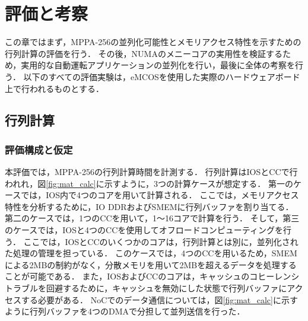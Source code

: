 \documentclass[submit,techrep]{ipsj_v2/UTF8/ipsj}
\begin{document}
\section{評価と考察}
\label{sec:evaluations}
この章ではまず，MPPA-256の並列化可能性とメモリアクセス特性を示すための行列計算の評価を行う．
その後，NUMAのメニーコアの実用性を検証するため，実用的な自動運転アプリケーションの並列化を行い，最後に全体の考察を行う．
以下のすべての評価実験は，eMCOSを使用した実際のハードウェアボード上で行われるものとする．


\subsection{行列計算}
\label{sec:martix_eval}

\subsubsection{評価構成と仮定}
\label{sec:situations_and_assumptions}
本評価では，MPPA-256の行列計算時間を計測する．
行列計算はIOSとCCで行われれ，図\ref{fig:mat_calc}に示すように，3つの計算ケースが想定する．
第一のケースでは，IOS内で4つのコアを用いて計算される．
ここでは，メモリアクセス特性を分析するために，IO DDRおよびSMEMに行列バッファを割り当てる．
第二のケースでは，1つのCCを用いて，1～16コアで計算を行う．
そして，第三のケースでは，IOSと4つのCCを使用してオフロードコンピューティングを行う．
ここでは，IOSとCCのいくつかのコアは，行列計算とは別に，並列化された処理の管理を担っている．
このケースでは，4つのCCを用いるため，SMEMによる2MBの制約がなく，分散メモリを用いて2MBを超えるデータを処理することが可能である．
また，IOSおよびCCのコアは，キャッシュのコヒーレンシトラブルを回避するために，キャッシュを無効にした状態で行列バッファにアクセスする必要がある．
NoCでのデータ通信については，図\ref{fig:mat_calc}に示すように行列バッファを4つのDMAで分担して並列送信を行った．
\end{document}
